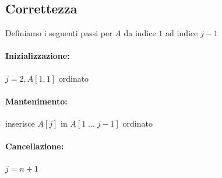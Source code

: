 \subsection{Correttezza}
Definiamo i seguenti passi per $A$ da indice $1$ ad indice $j-1$
\paragraph{Inizializzazione:} $j=2, A[1,1]$ ordinato
\paragraph{Mantenimento:} inserisce $A[j]$ in $A[1 \; ... \; j-1]$ ordinato
\paragraph{Cancellazione:} $j=n+1$

\newpage